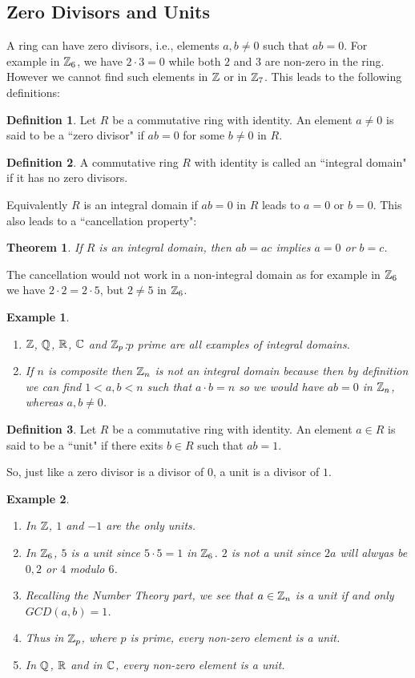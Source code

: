 \documentclass[12pt]{article}
\theoremstyle{plain}
\newtheorem{example}{Example}
\newtheorem{theorem}{Theorem}
\theoremstyle{definition}
\newtheorem{definition}{Definition}
\theoremstyle{remark}
\begin{document}
    \subsection{Zero Divisors and Units}
    A ring can have zero divisors, i.e., elements $a,b \neq 0$ such that $ab=0$. For example in $\mathbb{Z}_6$, we have $2\cdot 3=0$ while both $2$ and $3$ are non-zero in the ring. However we cannot find such elements in $\mathbb{Z}$ or in $\mathbb{Z}_7$. This leads to the following definitions:
    \begin{definition}
    Let $R$ be a commutative ring with identity. An element $a\neq 0$ is said to be a ``zero divisor" if $ab=0$ for some $b\neq 0$ in $R$. 
    \end{definition}
    \begin{definition}
    A commutative ring $R$ with identity is called an ``integral domain" if it has no zero divisors.
    \end{definition}
Equivalently $R$ is an integral domain if $ab=0$ in $R$ leads to $a=0$ or $b=0$. This also leads to a ``cancellation property":
\begin{theorem}
If $R$ is an integral domain, then $ab=ac$ implies $a=0$ or $b=c$.
\end{theorem}
The cancellation would not work in a non-integral domain as for example in $\mathbb{Z}_6$ we have $2\cdot 2=2\cdot 5$, but $2\neq 5$ in $\mathbb{Z}_6$.  
\begin{example}
\begin{enumerate}
    \item $\mathbb{Z}$, $\mathbb{Q}$, $\mathbb{R}$, $\mathbb{C}$ and $\mathbb{Z}_p$:$p$ prime
 are all examples of integral domains. 
 \item If $n$ is composite then $\mathbb{Z}_n$ is not an integral domain because then by definition we can find $1<a,b<n$ such that $a\cdot b=n$ so we would have $ab=0$ in $\mathbb{Z}_n$, whereas $a, b\neq 0$. 
 \end{enumerate}
 \end{example}
 \begin{definition}
    Let $R$ be a commutative ring with identity. An element $a\in R$ is said to be a ``unit" if there exits $b\in R$ such that $ab=1$.
 \end{definition}

So,  just like a zero divisor is a divisor of $0$, a unit is a divisor of $1$. 

\begin{example}
\begin{enumerate}
    \item In $\mathbb{Z}$, $1$ and $-1$ are the only units.
    \item In $\mathbb{Z}_6$, $5$ is a unit since $5\cdot 5 =1$ in $\mathbb{Z}_6$. $2$ is not a unit since $2a$ will alwyas be $0,2$ or $4$ modulo $6$.
    \item Recalling the Number Theory part, we see that $a\in \mathbb{Z}_n$ is a unit if and only $GCD(a,b)=1$.
    \item Thus in $\mathbb{Z}_p$, where $p$ is prime, every non-zero element is a unit. 
    \item In $\mathbb{Q}$, $\mathbb{R}$ and in $\mathbb{C}$, every non-zero element is a unit. 
\end{enumerate}
\end{example}
\end{document}
